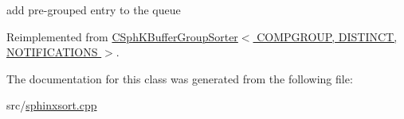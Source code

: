 add pre-\/grouped entry to the queue 



Reimplemented from \hyperlink{classCSphKBufferGroupSorter_a3a0ed37c3dd9c06fc2524df71a9d45d1}{C\-Sph\-K\-Buffer\-Group\-Sorter$<$ C\-O\-M\-P\-G\-R\-O\-U\-P, D\-I\-S\-T\-I\-N\-C\-T, N\-O\-T\-I\-F\-I\-C\-A\-T\-I\-O\-N\-S $>$}.



The documentation for this class was generated from the following file\-:\begin{DoxyCompactItemize}
\item 
src/\hyperlink{sphinxsort_8cpp}{sphinxsort.\-cpp}\end{DoxyCompactItemize}

